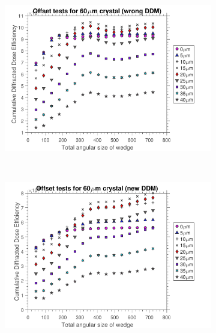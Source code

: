\begin{figure}
    \ContinuedFloat
    \begin{subfigure}[b]{1\textwidth}
        \centering
        \includegraphics[width=\textwidth]{figures/dwd/OffsetSimulationDDMwrongCrystSize60.pdf}
        \caption{}
        \label{fig:Offset simulations 60 - Decreasing Eta}
    \end{subfigure}
    \\
    \begin{subfigure}[b]{1\textwidth}
        \centering
        \includegraphics[width=\textwidth]{figures/dwd/OffsetSimulationDDMnewCrystSize60.pdf}
        \caption{}
        \label{fig:Offset simulations 60 - Increasing Eta}
    \end{subfigure}
    \caption{}
    \label{fig:Offset simulations}
\end{figure}

